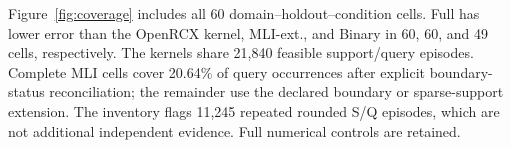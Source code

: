 Figure~\ref{fig:coverage} includes all 60 domain--holdout--condition cells. Full has lower error than the OpenRCX kernel, MLI-ext., and Binary in 60, 60, and 49 cells, respectively. The kernels share 21,840 feasible support/query episodes. Complete MLI cells cover 20.64\% of query occurrences after explicit boundary-status reconciliation; the remainder use the declared boundary or sparse-support extension. The inventory flags 11,245 repeated rounded S/Q episodes, which are not additional independent evidence. Full numerical controls are retained.
